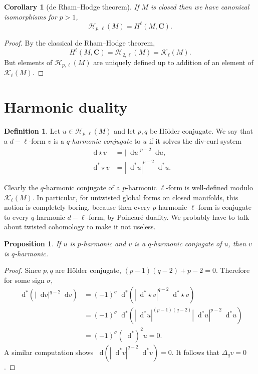 \documentclass[reqno,10pt]{amsart}
\newcommand{\CC}{\mathbf{C}}
\newcommand*\dif{\mathop{}\!\mathrm{d}}
\newcommand{\dfn}[1]{\emph{#1}\index{#1}}
\newtheorem{proposition}[theorem]{Proposition}
\newtheorem{corollary}[theorem]{Corollary}
\theoremstyle{definition}
\newtheorem{definition}[theorem]{Definition}
\numberwithin{equation}{section}
\begin{document}
\begin{corollary}[de Rham--Hodge theorem]
If $M$ is closed then we have canonical isomorphisms for $p > 1$,
$$\mathscr H_{p, \ell}(M) = H^\ell(M, \CC).$$
\end{corollary}
\begin{proof}
By the classical de Rham--Hodge theorem,
$$H^\ell(M, \CC) = \mathscr H_{2, \ell}(M) = \mathscr K_\ell(M).$$
But elements of $\mathscr H_{p, \ell}(M)$ are uniquely defined up to addition of an element of $\mathscr K_\ell(M)$.
\end{proof}

\section{Harmonic duality}
\begin{definition}
Let $u \in \mathscr H_{p, \ell}(M)$ and let $p, q$ be H\"older conjugate.
We say that a $d-\ell$-form $v$ is a $q$-\dfn{harmonic conjugate} to $u$ if it solves the div-curl system
\begin{align*}
\dif \star v &= |\dif u|^{p - 2} \dif u, \\
\dif^* \star v &= |\dif^* u|^{p - 2} \dif^* u.
\end{align*}
\end{definition}

Clearly the $q$-harmonic conjugate of a $p$-harmonic $\ell$-form is well-defined modulo $\mathscr K_\ell(M)$.
In particular, for untwisted global forms on closed manifolds, this notion is completely boring, because then every $p$-harmonic $\ell$-form is conjugate to every $q$-harmonic $d-\ell$-form, by Poincar\'e duality.
We probably have to talk about twisted cohomology to make it not useless.

\begin{proposition}
If $u$ is $p$-harmonic and $v$ is a $q$-harmonic conjugate of $u$, then $v$ is $q$-harmonic.
\end{proposition}
\begin{proof}
Since $p, q$ are H\"older conjugate, $(p - 1)(q - 2) + p - 2 = 0$.
Therefore for some sign $\sigma$,
\begin{align*}
\dif^*(|\dif v|^{q - 2} \dif v) &= (-1)^\sigma \dif^*(|\dif^* \star v|^{q - 2} \dif^* \star v) \\
&= (-1)^\sigma \dif^* (|\dif^* u|^{(p - 1)(q - 2)} |\dif^* u|^{p - 2} \dif^* u) \\
&= (-1)^\sigma (\dif^*)^2 u = 0.
\end{align*}
A similar computation shows $\dif(|\dif^* v|^{q - 2} \dif^* v) = 0$.
It follows that $\Delta_q v = 0$.
\end{proof}
\end{document}

